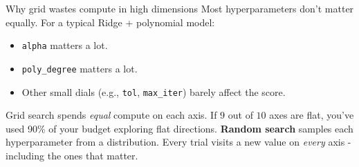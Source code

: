 \documentclass[aspectratio=169]{beamer}
\begin{document}
\begin{frame}{Why grid wastes compute in high dimensions}
  Most hyperparameters don't matter equally. For a typical Ridge + polynomial model:
  \begin{itemize}
    \item \texttt{alpha} matters a lot.
    \item \texttt{poly\_degree} matters a lot.
    \item Other small dials (e.g., \texttt{tol}, \texttt{max\_iter}) barely affect the score.
  \end{itemize}
  \vfill
  Grid search spends \emph{equal} compute on each axis. If $9$ out of $10$ axes are flat, you've used 90\% of your budget exploring flat directions.
  \vfill
  \textbf{Random search} samples each hyperparameter from a distribution. Every trial visits a new value on \emph{every} axis - including the ones that matter.
\end{frame}
\end{document}
